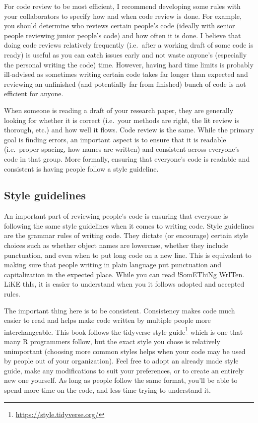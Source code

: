 \documentclass[
]{krantz}
\renewcommand{\href}[2]{#2\footnote{\url{#1}}}
\begin{document}
For code review to be most efficient, I recommend developing some rules with your collaborators to specify how and when code review is done. For example, you should determine who reviews certain people's code (ideally with senior people reviewing junior people's code) and how often it is done. I believe that doing code reviews relatively frequently (i.e.~after a working draft of some code is ready) is useful as you can catch issues early and not waste anyone's (especially the personal writing the code) time. However, having hard time limits is probably ill-advised as sometimes writing certain code takes far longer than expected and reviewing an unfinished (and potentially far from finished) bunch of code is not efficient for anyone.

When someone is reading a draft of your research paper, they are generally looking for whether it is correct (i.e.~your methods are right, the lit review is thorough, etc.) and how well it flows. Code review is the same. While the primary goal is finding errors, an important aspect is to ensure that it is readable (i.e.~proper spacing, how names are written) and consistent across everyone's code in that group. More formally, ensuring that everyone's code is readable and consistent is having people follow a style guideline.

\hypertarget{style-guidelines}{%
\subsection{Style guidelines}\label{style-guidelines}}

An important part of reviewing people's code is ensuring that everyone is following the same style guidelines when it comes to writing code. Style guidelines are the grammar rules of writing code. They dictate (or encourage) certain style choices such as whether object names are lowercase, whether they include punctuation, and even when to put long code on a new line. This is equivalent to making sure that people writing in plain language put punctuation and capitalization in the expected place. While you can read !SomEThiNg WrITen. LiKE thIs, it is easier to understand when you it follows adopted and accepted rules.

The important thing here is to be consistent. Consistency makes code much easier to read and helps make code written by multiple people more interchangeable. This book follows the \href{https://style.tidyverse.org/}{tidyverse style guide} which is one that many R programmers follow, but the exact style you chose is relatively unimportant (choosing more common styles helps when your code may be used by people out of your organization). Feel free to adopt an already made style guide, make any modifications to suit your preferences, or to create an entirely new one yourself. As long as people follow the same format, you'll be able to spend more time on the code, and less time trying to understand it.
\end{document}

